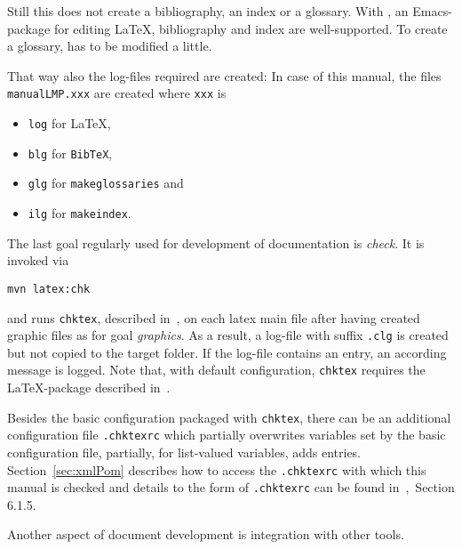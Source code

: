 Still this does not create a bibliography, an index or a glossary. 
With \auctex{}, an Emacs-package for editing \LaTeX, 
bibliography and index are well-supported. 
To create a glossary, \auctex{} has to be modified a little. 


That way also the log-files required are created: 
In case of this manual, 
the files \texttt{manualLMP.xxx} are created 
where \texttt{xxx} is 
%
\begin{itemize}
\item
\texttt{log} for \LaTeX, 
\item
\texttt{blg} for \texttt{BibTeX}, 
\item
\texttt{glg} for \texttt{makeglossaries} and 
\item
\texttt{ilg} for \texttt{makeindex}. 
\end{itemize}

The last goal regularly used for development of documentation is \emph{check}. 
It is invoked via 
% 
\begin{Verbatim}
mvn latex:chk
\end{Verbatim}
%
and runs \texttt{chktex}, described in~\cite{ChkTeX22}, 
on each latex main file 
after having created graphic files as for goal \emph{graphics}. 
As a result, a log-file with suffix \texttt{.clg} is created 
but not copied to the target folder. 
If the log-file contains an entry, 
an according message is logged. 
Note that, with default configuration, 
\texttt{chktex} requires the \LaTeX-package  
described in~\cite{BooktP}. 

Besides the basic configuration packaged with \texttt{chktex}, 
there can be an additional configuration file \texttt{.chktexrc} 
which partially overwrites variables set by the basic configuration file, 
partially, for list-valued variables, adds entries. 
Section~\ref{sec:xmlPom} describes how to access the \texttt{.chktexrc} 
with which this manual is checked and 
details to the form of \texttt{.chktexrc} can be found in~\cite{ChkTeX22},~Section 6.1.5.  





Another aspect of document development is integration with other tools. 

